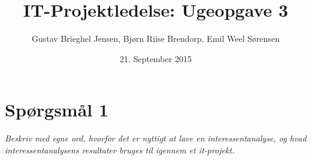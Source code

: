\documentclass{article}
\title{IT-Projektledelse: Ugeopgave 3}
\author{Gustav Brieghel Jensen, Bjørn Riise Brendorp, Emil Weel Sørensen  }
\date{21. September 2015}
\begin{document}
\maketitle

\section*{Spørgsmål 1}
\textit{Beskriv med egne ord, hvorfor det er nyttigt at lave en interessentanalyse, og hvad
interessentanalysens resultater bruges til igennem et it-projekt.} \\
\end{document}
